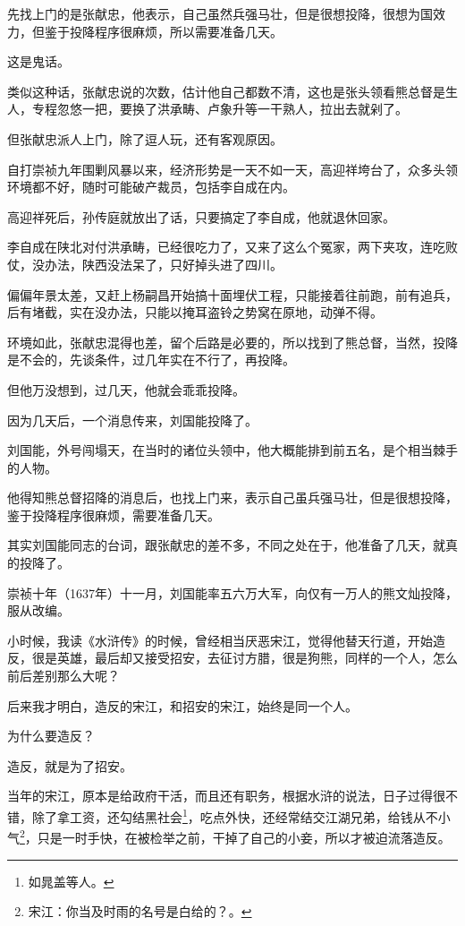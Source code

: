 \begin{multicols}{\theparacolNo}
		先找上门的是张献忠，他表示，自己虽然兵强马壮，但是很想投降，很想为国效力，但鉴于投降程序很麻烦，所以需要准备几天。

		这是鬼话。

		类似这种话，张献忠说的次数，估计他自己都数不清，这也是张头领看熊总督是生人，专程忽悠一把，要换了洪承畴、卢象升等一干熟人，拉出去就剁了。

		但张献忠派人上门，除了逗人玩，还有客观原因。

		自打崇祯九年围剿风暴以来，经济形势是一天不如一天，高迎祥垮台了，众多头领环境都不好，随时可能破产裁员，包括李自成在内。

		高迎祥死后，孙传庭就放出了话，只要搞定了李自成，他就退休回家。

		李自成在陕北对付洪承畴，已经很吃力了，又来了这么个冤家，两下夹攻，连吃败仗，没办法，陕西没法呆了，只好掉头进了四川。

		偏偏年景太差，又赶上杨嗣昌开始搞十面埋伏工程，只能接着往前跑，前有追兵，后有堵截，实在没办法，只能以掩耳盗铃之势窝在原地，动弹不得。

		环境如此，张献忠混得也差，留个后路是必要的，所以找到了熊总督，当然，投降是不会的，先谈条件，过几年实在不行了，再投降。

		但他万没想到，过几天，他就会乖乖投降。

		因为几天后，一个消息传来，刘国能投降了。

		刘国能，外号闯塌天，在当时的诸位头领中，他大概能排到前五名，是个相当棘手的人物。

		他得知熊总督招降的消息后，也找上门来，表示自己虽兵强马壮，但是很想投降，鉴于投降程序很麻烦，需要准备几天。

		其实刘国能同志的台词，跟张献忠的差不多，不同之处在于，他准备了几天，就真的投降了。

		崇祯十年（1637年）十一月，刘国能率五六万大军，向仅有一万人的熊文灿投降，服从改编。

		小时候，我读《水浒传》的时候，曾经相当厌恶宋江，觉得他替天行道，开始造反，很是英雄，最后却又接受招安，去征讨方腊，很是狗熊，同样的一个人，怎么前后差别那么大呢？

		后来我才明白，造反的宋江，和招安的宋江，始终是同一个人。

		为什么要造反？

		造反，就是为了招安。

		当年的宋江，原本是给政府干活，而且还有职务，根据水浒的说法，日子过得很不错，除了拿工资，还勾结黑社会\footnote{如晁盖等人。}，吃点外快，还经常结交江湖兄弟，给钱从不小气\footnote{宋江：你当及时雨的名号是白给的？。}，只是一时手快，在被检举之前，干掉了自己的小妾，所以才被迫流落造反。


\end{multicols}
